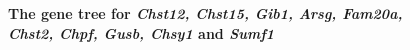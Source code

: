 \documentclass{article}
\begin{document}
\begin{figure}[H]
\centering
{}
\caption{\textbf{The gene tree for \textit{Chst12, Chst15, Gib1, Arsg, Fam20a, Chst2, Chpf, Gusb, Chsy1} and \textit{Sumf1}}}
\label{sup_fig_13}
\end{figure}
\end{document}
